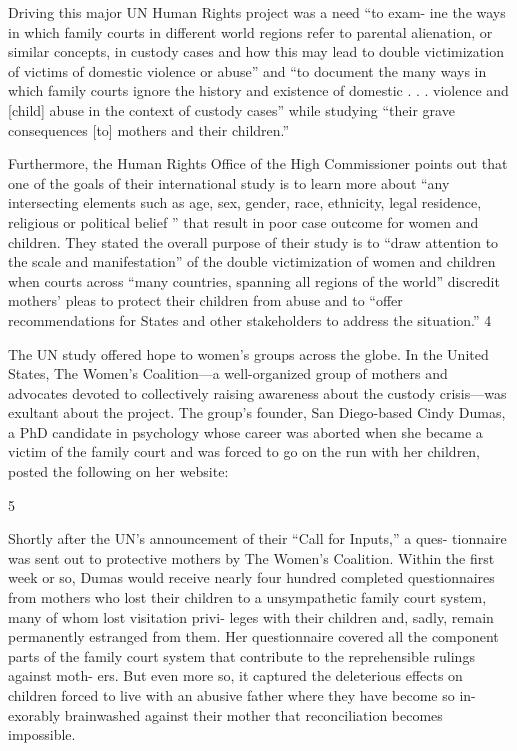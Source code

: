 Driving this major UN Human Rights project was a need “to exam-
ine the ways in which family courts in different world regions refer
to parental alienation, or similar concepts, in custody cases and how
this may lead to double victimization of victims of domestic violence or
abuse” and “to document the many ways in which family courts ignore
the history and existence of domestic . . . violence and [child] abuse in
the context of custody cases” while studying “their grave consequences
[to] mothers and their children.” \pfl{}


Furthermore, the Human Rights Office of the High Commissioner
points out that one of the goals of their international study is to learn
more about “any intersecting elements such as age, sex, gender, race,
ethnicity, legal residence, religious or political belief ” that result in poor
case outcome for women and children. They stated the overall purpose
of their study is to “draw attention to the scale and manifestation” of the
double victimization of women and children when courts across “many
countries, spanning all regions of the world” discredit mothers’ pleas
to protect their children from abuse and to “offer recommendations for
States and other stakeholders to address the situation.” 4 \pfl{}


The UN study offered hope to women’s groups across the globe. In
the United States, The Women’s Coalition—a well-organized group of
mothers and advocates devoted to collectively raising awareness about
the custody crisis—was exultant about the project. The group’s founder,
San Diego-based Cindy Dumas, a PhD candidate in psychology whose
career was aborted when she became a victim of the family court and
was forced to go on the run with her children, posted the following on
her website:

5

\noindent{}Shortly after the UN’s announcement of their “Call for Inputs,” a ques-
tionnaire was sent out to protective mothers by The Women’s Coalition.
Within the first week or so, Dumas would receive nearly four hundred
completed questionnaires from mothers who lost their children to a
unsympathetic family court system, many of whom lost visitation privi-
leges with their children and, sadly, remain permanently estranged from
them. Her questionnaire covered all the component parts of the family
court system that contribute to the reprehensible rulings against moth-
ers. But even more so, it captured the deleterious effects on children
forced to live with an abusive father where they have become so in-
exorably brainwashed against their mother that reconciliation becomes
impossible. \pfl{}


